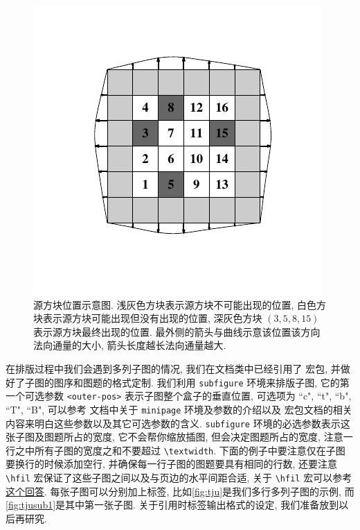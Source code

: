 \begin{figure}[htbp]
  \centering
  \includegraphics{figures/source-block-picture.pdf}
  \caption{源方块位置示意图. 浅灰色方块表示源方块不可能出现的位置, 白色方块表示源方块可能出现但没有出现的位置, 深灰色方块 $(3, 5, 8, 15)$ 表示源方块最终出现的位置. 最外侧的箭头与曲线示意该位置该方向法向通量的大小, 箭头长度越长法向通量越大.}\label{fig:sb-pic}
\end{figure}

在排版过程中我们会遇到多列子图的情况, 我们在文档类中已经引用了  宏包, 并做好了子图的图序和图题的格式定制. 我们利用 \verb|subfigure| 环境来排版子图, 它的第一个可选参数 \verb|<outer-pos>| 表示子图整个盒子的垂直位置, 可选项为 ``c", ``t", ``b", ``T", ``B", 可以参考  文档中关于 \verb|minipage| 环境及参数的介绍以及  宏包文档的相关内容来明白这些参数以及其它可选参数的含义. \verb|subfigure| 环境的必选参数表示这张子图及图题所占的宽度, 它不会帮你缩放插图, 但会决定图题所占的宽度, 注意一行之中所有子图的宽度之和不要超过 \verb|\textwidth|. 下面的例子中要注意仅在子图要换行的时候添加空行, 并确保每一行子图的图题要具有相同的行数, 还要注意 \verb|\hfil| 宏保证了这些子图之间以及与页边的水平间距合适, 关于 \verb|\hfil| 宏可以参考\href{https://tex.stackexchange.com/a/528921/184559}{这个回答}. 每张子图可以分别加上标签, 比如\ref{fig:tju}是我们多行多列子图的示例, 而\ref{fig:tjusub1}是其中第一张子图. 关于引用时标签输出格式的设定, 我们准备放到以后再研究.

